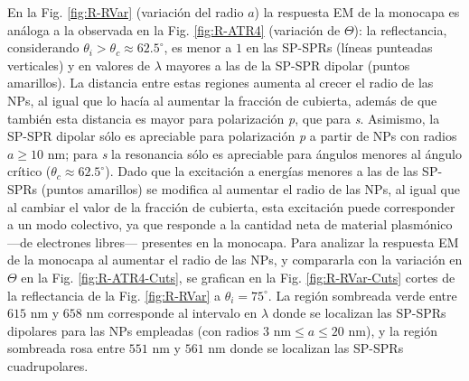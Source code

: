 En la Fig.   \ref{fig:R-RVar} (variación del radio $a$) la respuesta EM de la monocapa es análoga a la observada en la Fig. \ref{fig:R-ATR4} (variación de $\Theta$): la reflectancia, considerando $\theta_i>\theta_c\approx 62.5^\circ$, es menor a $1$ en las SP-SPRs (líneas punteadas verticales) y en valores de $\lambda$ mayores a las de la SP-SPR dipolar (puntos amarillos). La distancia entre estas regiones aumenta al crecer el radio de las NPs, al igual que lo hacía al aumentar la fracción de cubierta, además de que también esta distancia es mayor para polarización \emph{p}, que para \emph{s}. Asimismo, la SP-SPR dipolar sólo es apreciable para polarización \emph{p} a partir de NPs con radios $a\geq 10$ nm; para \emph{s} la resonancia sólo es apreciable para ángulos menores al ángulo crítico ($\theta_c\approx 62.5^\circ$). Dado que la excitación a energías menores a las de las SP-SPRs (puntos amarillos) se modifica al aumentar el radio de las NPs, al igual que al cambiar el valor de la fracción de cubierta, esta excitación puede corresponder a un modo colectivo, ya que responde a la cantidad neta de material plasmónico ---de electrones libres--- presentes en la monocapa. Para analizar la respuesta EM de la monocapa al aumentar el radio de las NPs, y compararla con la variación en $\Theta$ en la Fig. \ref{fig:R-ATR4-Cuts},  se grafican en la Fig. \ref{fig:R-RVar-Cuts}  cortes de la reflectancia de la Fig. \ref{fig:R-RVar} a $\theta_i = 75^\circ$. La región sombreada verde entre $615$ nm y $658$ nm corresponde al intervalo en $\lambda$ donde se localizan las SP-SPRs dipolares para las NPs empleadas (con radios $3\mbox{ nm}\leq a \leq 20\mbox{ nm}$), y la región sombreada rosa entre $551$ nm y $561$ nm donde se localizan las SP-SPRs cuadrupolares.

